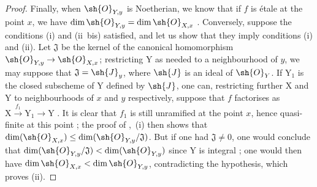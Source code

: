 \begin{proof}
Finally, when $\sh{O}_{Y,y}$ is Noetherian, we know that if $f$ is \'etale at the point $x$, we have $\dim\sh{O}_{Y,y}=\dim\sh{O}_{X,x}$ .
Conversely, suppose the conditions (i) and (ii~bis) satisfied, and let us show that they imply conditions (i) and (ii).
Let $\mathfrak{J}$ be the kernel of the canonical homomorphism $\sh{O}_{Y,y}\to\sh{O}_{X,x}$; restricting Y as needed to a neighbourhood of $y$, we may suppose that $\mathfrak{J}=\sh{J}_y$, where $\sh{J}$ is an ideal of $\sh{O}_Y$.
If $\mathrm{Y}_1$ is the closed subscheme of $\mathrm{Y}$ defined by $\sh{J}$, one can, restricting further $\mathrm{X}$ and $\mathrm{Y}$ to neighbourhoods of $x$ and $y$ respectively, suppose that $f$ factorises as $\mathrm{X}\xrightarrow{f_1}\mathrm{Y}_1\to\mathrm{Y}$ .
It is clear that $f_1$ is still unramified at the point $x$, hence quasi-finite at this point ; the proof of ,~(i) then shows that $\dim(\sh{O}_{X,x})\leq\dim(\sh{O}_{Y,y}/\mathfrak{J})$.
But if one had $\mathfrak{J}\neq 0$, one would conclude that $\dim(\sh{O}_{Y,y}/\mathfrak{J})<\dim(\sh{O}_{Y,y})$ since $\mathrm{Y}$ is integral ; one would then have $\dim\sh{O}_{X,x}<\dim\sh{O}_{Y,y}$, contradicting the hypothesis, which proves (ii).
\end{proof}

